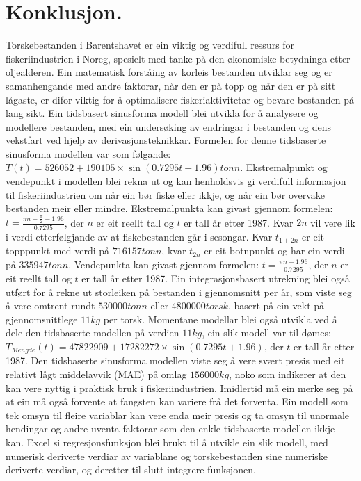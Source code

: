 \documentclass{report}
\begin{document}
\chapter{Konklusjon.}
Torskebestanden i Barentshavet er ein viktig og verdifull ressurs for fiskeriindustrien i Noreg, spesielt med tanke på den økonomiske betydninga etter oljealderen. Ein matematisk forståing av korleis bestanden utviklar seg og er samanhengande med andre faktorar, når den er på topp og når den er på sitt lågaste, er difor viktig for å optimalisere fiskeriaktivitetar og bevare bestanden på lang sikt.
Ein tidsbasert sinusforma modell blei utvikla for å analysere og modellere bestanden, med ein undersøking av endringar i bestanden og dens vekstfart ved hjelp av derivasjonsteknikkar.
Formelen for denne tidsbaserte sinusforma modellen var som følgande: $T(t) = 526052+190105\times \sin(0.7295t+1.96)tonn$.
Ekstremalpunkt og vendepunkt i modellen blei rekna ut og kan henholdsvis gi verdifull informasjon til fiskeriindustrien om når ein bør fiske eller ikkje, og når ein bør overvake bestanden meir eller mindre.
Ekstremalpunkta kan givast gjennom formelen: $t=\frac{\pi n - \frac{\pi}{2}-1.96}{0.7295}$, der $n$ er eit reellt tall og $t$ er tall år etter 1987. 
Kvar $2n$ vil vere lik i verdi etterfølgjande av at fiskebestanden går i sesongar.
Kvar $t_{1+2n}$ er eit topppunkt med verdi på $716157tonn$, kvar $t_{2n}$ er eit botnpunkt og har ein verdi på $335947tonn$.
Vendepunkta kan givast gjennom formelen: $t=\frac{\pi n -1.96}{0.7295}$, der $n$ er eit reellt tall og $t$ er tall år etter 1987.
Ein integrasjonsbasert utrekning blei også utført for å rekne ut storleiken på bestanden i gjennomsnitt per år, som viste seg å vere omtrent rundt $530000tonn$ eller $4800000 torsk$, basert på ein vekt på gjennomsnittlege $11kg$ per torsk.
Momentane modellar blei også utvikla ved å dele den tidsbaserte modellen på verdien $11kg$, ein slik modell var til dømes: $T_{Mengde}(t)=47822909+17282272\times \sin(0.7295t+1.96)$, der $t$ er tall år etter 1987.
Den tidsbaserte sinusforma modellen viste seg å vere svært presis med eit relativt lågt middelavvik (MAE) på omlag $156000kg$, noko som indikerer at den kan vere nyttig i praktisk bruk i fiskeriindustrien. Imidlertid må ein merke seg på at ein må også forvente at fangsten kan variere frå det forventa.
Ein modell som tek omsyn til fleire variablar kan vere enda meir presis og ta omsyn til unormale hendingar og andre uventa faktorar som den enkle tidsbaserte modellen ikkje kan. Excel si regresjonsfunksjon blei brukt til å utvikle ein slik modell, med numerisk deriverte verdiar av variablane og torskebestanden sine numeriske deriverte verdiar, og deretter til slutt integrere funksjonen.
\end{document}
